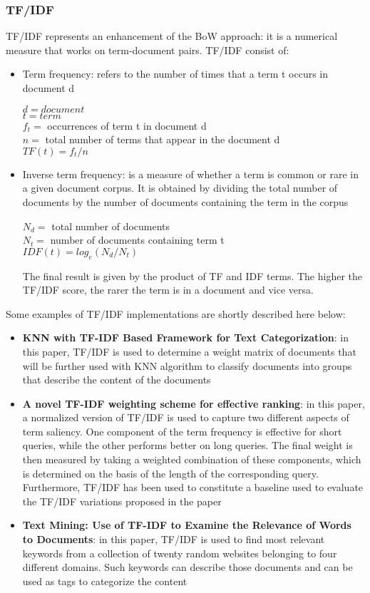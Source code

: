 \documentclass[\main/main.tex]{subfiles}
\begin{document}
\subsubsection{TF/IDF}
TF/IDF represents an enhancement of the BoW approach: it is a numerical measure that works on term-document pairs. TF/IDF consist of:
\begin{itemize}
    \item Term frequency: refers to the number of times that a term t occurs in document d
    \begin{center}
        $d=document$\\
        $t=term$\\
        $f_t=$  occurrences of term t in document d\\
        $n =$ total number of terms that appear in the document d \\
        $TF(t) = f_t / n$
    \end{center}
    \item Inverse term frequency: is a measure of whether a term is common or rare in a given document corpus. It is obtained by dividing the total number of documents by the number of documents containing the term in the corpus \cite{NETTLETON2014171}
    \begin{center}
        $N_d = $ total number of documents\\
        $N_t = $ number of documents containing term t\\
        $IDF(t) = log_e(N_d/N_t)$
    \end{center}
    The final result is given by the product of TF and IDF terms. The higher the TF/IDF score, the rarer the term is in a document and vice versa.
\end{itemize}
Some examples of TF/IDF implementations are shortly described here below:
\begin{itemize}
    \item \textbf{KNN with TF-IDF Based Framework for Text Categorization}: in this paper, TF/IDF is used to determine a weight matrix of documents that will be further used with KNN algorithm to classify documents into groups that describe the content of the documents  \cite{Trstenjak2014KNNWT}
    \item \textbf{A novel TF-IDF weighting scheme for effective ranking}: in this paper, a normalized version of TF/IDF is used to capture two different aspects of term saliency. One component of the term frequency is effective for short queries, while the other performs better on long queries. The final weight is then measured by taking a weighted combination of these components, which is determined on the basis of the length of the corresponding query. Furthermore, TF/IDF has been used to constitute a baseline used to evaluate the TF/IDF variations proposed in the paper \cite{Paik2013ANT}
    \item \textbf{Text Mining: Use of TF-IDF to Examine the Relevance of Words to Documents}: in this paper, TF/IDF is used to find most relevant keywords from a collection of twenty random websites belonging to four different domains. Such keywords can describe those documents and can be used as tags to categorize the content \cite{Qaiser2018TextMU}
\end{itemize}
\end{document}
